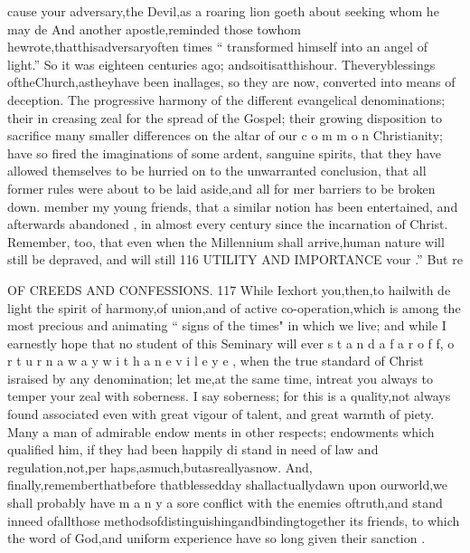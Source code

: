 \documentclass[
]{book}
\begin{document}
cause your adversary,the Devil,as a roaring lion goeth about seeking whom he may de
And another apostle,reminded those towhom hewrote,thatthisadversaryoften times `` transformed himself into an angel of light.'' So it was eighteen centuries ago; andsoitisatthishour. Theveryblessings oftheChurch,astheyhave been inallages, so they are now, converted into means of deception. The progressive harmony of the different evangelical denominations; their in creasing zeal for the spread of the Gospel; their growing disposition to sacrifice many smaller differences on the altar of our c o m m o n
Christianity; have so fired the imaginations of some ardent, sanguine spirits, that they have allowed themselves to be hurried on to
the unwarranted conclusion, that all former
rules were about to be laid aside,and all for mer barriers to be broken down.
member my young friends, that a similar notion has been entertained, and afterwards
abandoned , in almost every century since the incarnation of Christ. Remember, too, that
even when the Millennium shall arrive,human nature will still be depraved, and will still
116 UTILITY AND IMPORTANCE
vour
.''
But re

OF CREEDS AND CONFESSIONS. 117
While Iexhort you,then,to hailwith de
light the spirit of harmony,of union,and of
active co-operation,which is among the most precious and animating `` signs of the times" in which we live; and while I earnestly hope
that no student of this Seminary will ever s t a n d a f a r o f f, o r t u r n a w a y w i t h a n e v i l e y e ,
when the true standard of Christ israised by any denomination; let me,at the same time,
intreat you always to temper your zeal with soberness. I say soberness; for this is a
quality,not always found associated even with
great vigour of talent, and great warmth of piety. Many a man of admirable endow
ments in other respects; endowments which qualified him, if they had been happily di
stand in need of law and regulation,not,per haps,asmuch,butasreallyasnow. And, finally,rememberthatbefore thatblessedday
shallactuallydawn upon ourworld,we shall probably have m a n y a sore conflict with the enemies oftruth,and stand inneed ofallthose methodsofdistinguishingandbindingtogether its friends, to which the word of God,and
uniform experience have so long given their sanction .
\end{document}
